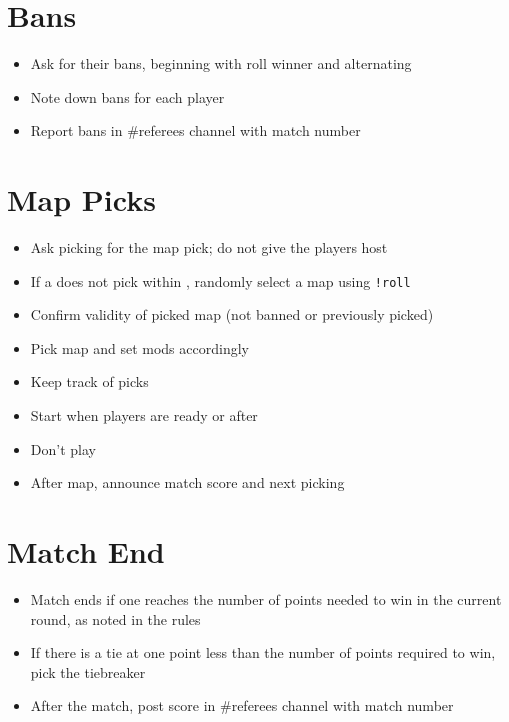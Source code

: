 \section{Bans}

\begin{itemize}
	\item Ask  for their bans, beginning with roll winner and alternating
	\item Note down bans for each player
	\item Report bans in \#referees channel with match number
\end{itemize}

\section{Map Picks}

\begin{itemize}
	\item Ask picking  for the map pick; do not give the players host
	\item If a  does not pick within \picktime, randomly select a map using \texttt{!roll}
	\item Confirm validity of picked map (not banned or previously picked)
	\item Pick map and set mods accordingly
	\item Keep track of picks
	\item Start when players are ready or after \readytime
	\item Don't play
	\item After map, announce match score and next picking 
\end{itemize}

\section{Match End}

\begin{itemize}
	\item Match ends if one  reaches the number of points needed to win in the current round, as noted in the rules
	\item If there is a tie at one point less than the number of points required to win, pick the tiebreaker
	\item After the match, post score in \#referees channel with match number
\end{itemize}

